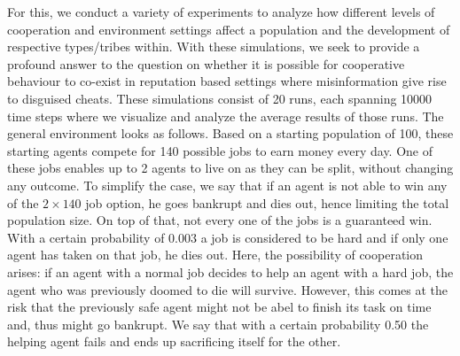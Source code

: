\documentclass[sigconf]{acmart}
\newcommand{\VNumSimulations}{20\xspace}
\newcommand{\VNumDays}{10000\xspace}
\newcommand{\VNumPop}{100\xspace}
\newcommand{\VNumTrees}{140\xspace}
\newcommand{\VProbPredator}{0.003\xspace}
\newcommand{\VProbAltruistDies}{0.50\xspace}
\begin{document}
    For this, we conduct a variety of experiments to analyze how different levels of cooperation and environment settings affect a population and the development of respective types/tribes within.
    With these simulations, we seek to provide a profound answer to the question on whether it is possible for cooperative behaviour to co-exist in reputation based settings where misinformation give rise to disguised cheats.
    These simulations consist of \VNumSimulations runs, each spanning \VNumDays time steps where we visualize and analyze the average results of those runs.
    The general environment looks as follows.
    Based on a starting population of \VNumPop, these starting agents compete for \VNumTrees possible jobs to earn money every day.
    One of these jobs enables up to 2 agents to live on as they can be split, without changing any outcome.
    To simplify the case, we say that if an agent is not able to win any of the $2 \times \VNumTrees$ job option, he goes bankrupt and dies out, hence limiting the total population size.
    On top of that, not every one of the jobs is a guaranteed win.
    With a certain probability of \VProbPredator a job is considered to be hard and if only one agent has taken on that job, he dies out.
    Here, the possibility of cooperation arises: if an agent with a normal job decides to help an agent with a hard job, the agent who was previously doomed to die will survive.
    However, this comes at the risk that the previously safe agent might not be abel to finish its task on time and, thus might go bankrupt.
    We say that with a certain probability \VProbAltruistDies the helping agent fails and ends up sacrificing itself for the other.
\end{document}
